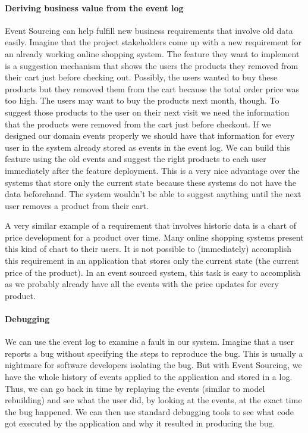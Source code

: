 \documentclass{book}
\begin{document}
\paragraph{Deriving business value from the event
log}\label{deriving-business-value-from-the-event-log}

Event Sourcing can help fulfill new business requirements that involve
old data easily. Imagine that the project stakeholders come up with a
new requirement for an already working online shopping system. The
feature they want to implement is a suggestion mechanism that shows the
users the products they removed from their cart just before checking
out. Possibly, the users wanted to buy these products but they removed
them from the cart because the total order price was too high. The users
may want to buy the products next month, though. To suggest those
products to the user on their next visit we need the information that
the products were removed from the cart just before checkout. If we
designed our domain events properly we should have that information for
every user in the system already stored as events in the event log. We
can build this feature using the old events and suggest the right
products to each user immediately after the feature deployment. This is
a very nice advantage over the systems that store only the current state
because these systems do not have the data beforehand. The system
wouldn't be able to suggest anything until the next user removes a
product from their cart.~\cite{greg-youtube}

A very similar example of a requirement that involves historic data is a
chart of price development for a product over time. Many online shopping
systems present this kind of chart to their users. It is not possible to
(immediately) accomplish this requirement in an application that stores
only the current state (the current price of the product). In an event
sourced system, this task is easy to accomplish as we probably already
have all the events with the price updates for every product.

\paragraph{Debugging}\label{debugging}

We can use the event log to examine a fault in our system. Imagine that
a user reports a bug without specifying the steps to reproduce the bug.
This is usually a nightmare for software developers isolating the bug.
But with Event Sourcing, we have the whole history of events applied to
the application and stored in a log. Thus, we can go back in time by
replaying the events (similar to model rebuilding) and see what the user
did, by looking at the events, at the exact time the bug happened. We
can then use standard debugging tools to see what code got executed by
the application and why it resulted in producing the bug.~\cite{greg-youtube}
\end{document}
